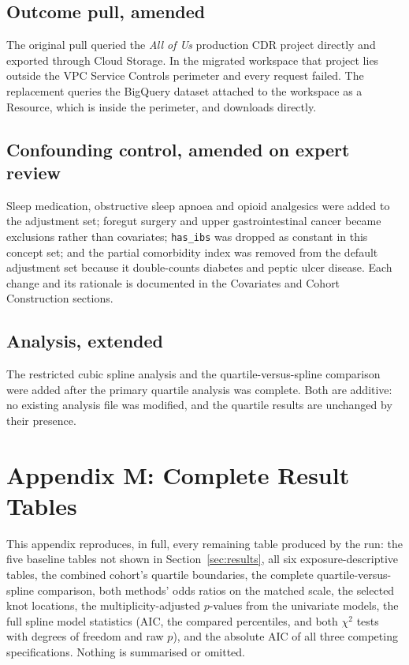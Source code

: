 \documentclass[11pt]{article}
\newcommand{\code}[1]{\texttt{\small #1}}
\begin{document}
\subsection{Outcome pull, amended}
The original pull queried the \emph{All of Us} production CDR project directly
and exported through Cloud Storage. In the migrated workspace that project lies
outside the VPC Service Controls perimeter and every request failed. The
replacement queries the BigQuery dataset attached to the workspace as a
Resource, which is inside the perimeter, and downloads directly.

\subsection{Confounding control, amended on expert review}
Sleep medication, obstructive sleep apnoea and opioid analgesics were added to
the adjustment set; foregut surgery and upper gastrointestinal cancer became
exclusions rather than covariates; \code{has_ibs} was dropped as constant in
this concept set; and the partial comorbidity index was removed from the default
adjustment set because it double-counts diabetes and peptic ulcer disease. Each
change and its rationale is documented in the Covariates and Cohort Construction
sections.

\subsection{Analysis, extended}
The restricted cubic spline analysis and the quartile-versus-spline comparison
were added after the primary quartile analysis was complete. Both are additive:
no existing analysis file was modified, and the quartile results are unchanged by
their presence.

\section{Appendix M: Complete Result Tables}
\label{sec:appM}
This appendix reproduces, in full, every remaining table produced by the run: the five baseline
tables not shown in Section~\ref{sec:results}, all six exposure-descriptive tables, the combined
cohort's quartile boundaries, the complete quartile-versus-spline comparison, both methods'
odds ratios on the matched scale, the selected knot locations, the multiplicity-adjusted
$p$-values from the univariate models, the full spline model statistics (AIC, the compared
percentiles, and both $\chi^2$ tests with degrees of freedom and raw $p$), and the absolute
AIC of all three competing specifications. Nothing is summarised or omitted.
\end{document}
